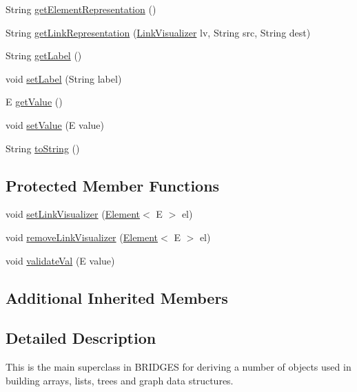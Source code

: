 \begin{DoxyCompactItemize}
\item 
String \mbox{\hyperlink{classbridges_1_1base_1_1_element_a8822450cfaf8495bc955d777ad35ea3f}{get\+Element\+Representation}} ()
\item 
String \mbox{\hyperlink{classbridges_1_1base_1_1_element_ae32deb37d1ad95d2fdfaa616062f319d}{get\+Link\+Representation}} (\mbox{\hyperlink{classbridges_1_1base_1_1_link_visualizer}{Link\+Visualizer}} lv, String src, String dest)
\item 
String \mbox{\hyperlink{classbridges_1_1base_1_1_element_a5c831a0238de487765f6021a887f1542}{get\+Label}} ()
\item 
void \mbox{\hyperlink{classbridges_1_1base_1_1_element_a942ccd766aeca0c4fdbe27ef8cbe78d9}{set\+Label}} (String label)
\item 
E \mbox{\hyperlink{classbridges_1_1base_1_1_element_a44ddc61db34b6cf0bab7dfba667d54af}{get\+Value}} ()
\item 
void \mbox{\hyperlink{classbridges_1_1base_1_1_element_ab3cf1241da0bc4c59cea9d6f0fd7aaf4}{set\+Value}} (E value)
\item 
String \mbox{\hyperlink{classbridges_1_1base_1_1_element_a7dc685e317fd9dc2e73e049a9f907e42}{to\+String}} ()
\end{DoxyCompactItemize}
\subsection*{Protected Member Functions}
\begin{DoxyCompactItemize}
\item 
void \mbox{\hyperlink{classbridges_1_1base_1_1_element_af6251f52b9d277dd77e3bab1829d0197}{set\+Link\+Visualizer}} (\mbox{\hyperlink{classbridges_1_1base_1_1_element}{Element}}$<$ E $>$ el)
\item 
void \mbox{\hyperlink{classbridges_1_1base_1_1_element_a144cd54e043a801fab326769a5da01e2}{remove\+Link\+Visualizer}} (\mbox{\hyperlink{classbridges_1_1base_1_1_element}{Element}}$<$ E $>$ el)
\item 
void \mbox{\hyperlink{classbridges_1_1base_1_1_element_af1a60f4e6a91d379179f7d56e6dc3829}{validate\+Val}} (E value)
\end{DoxyCompactItemize}
\subsection*{Additional Inherited Members}


\subsection{Detailed Description}
This is the main superclass in B\+R\+I\+D\+G\+ES for deriving a number of objects used in building arrays, lists, trees and graph data structures. 

